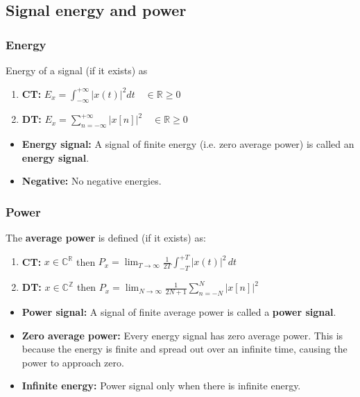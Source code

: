 \subsection{Signal energy and power}
    \subsubsection{Energy}
    \begin{definition}
        Energy of a signal (if it exists) as
        \begin{enumerate}
            \item \textbf{CT:} $ E_x = \int_{-\infty}^{+\infty} |x(t)|^2 dt \quad \in \mathbb{R} \geq 0 $
            \item \textbf{DT:} $ E_x = \sum_{n=-\infty}^{+\infty} |x[n]|^2 \quad \in \mathbb{R} \geq 0 $
        \end{enumerate}
        \begin{itemize}
            \item \textbf{Energy signal:} A signal of finite energy (i.e. zero average power) is called an \textbf{energy signal}.
            \item \textbf{Negative:} No negative energies.
        \end{itemize}
    \end{definition}

    \subsubsection{Power}
    \begin{definition}
        The \textbf{average power} is defined (if it exists) as: 
        \begin{enumerate}
            \item \textbf{CT:} \( x \in \mathbb{C}^\mathbb{R} \) then $P_x = \lim_{T \to \infty} \frac{1}{2T} \int_{-T}^{+T} |x(t)|^2 \, dt$
            \item \textbf{DT:} \( x \in \mathbb{C}^\mathbb{Z} \) then $P_x = \lim_{N \to \infty} \frac{1}{2N+1} \sum_{n=-N}^{N} |x[n]|^2$
        \end{enumerate}
        \begin{itemize}
            \item \textbf{Power signal:} A signal of finite average power is called a \textbf{power signal}.
        \end{itemize}
    \end{definition}
    

    \begin{warning}
        \begin{itemize}
            \item \textbf{Zero average power:} Every energy signal has zero average power. This is because the energy is finite and spread out over an infinite time, causing the power to approach zero. 
            \item \textbf{Infinite energy:} Power signal only when there is infinite energy.
        \end{itemize}
    \end{warning}

